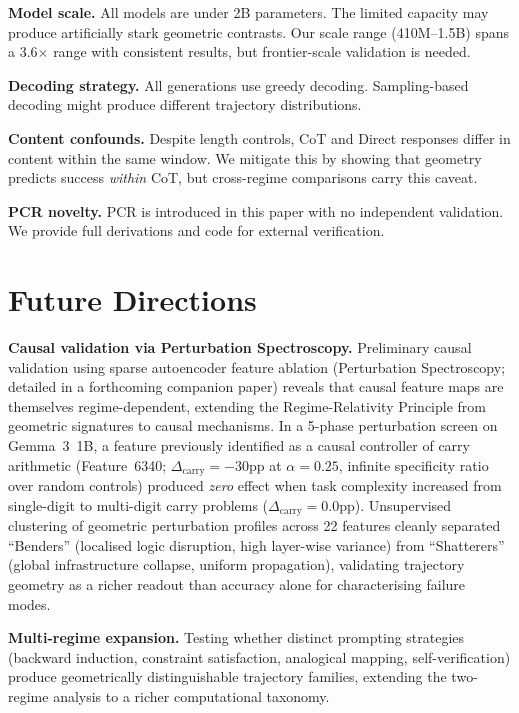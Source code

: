 \documentclass[11pt,twocolumn]{article}
\begin{document}
\textbf{Model scale.} All models are under 2B parameters. The limited capacity may produce artificially stark geometric contrasts. Our scale range (410M--1.5B) spans a 3.6$\times$ range with consistent results, but frontier-scale validation is needed.

\textbf{Decoding strategy.} All generations use greedy decoding. Sampling-based decoding might produce different trajectory distributions.

\textbf{Content confounds.} Despite length controls, CoT and Direct responses differ in content within the same window. We mitigate this by showing that geometry predicts success \emph{within} CoT, but cross-regime comparisons carry this caveat.

\textbf{PCR novelty.} PCR is introduced in this paper with no independent validation. We provide full derivations and code for external verification.


\section{Future Directions}
\label{sec:future}

\textbf{Causal validation via Perturbation Spectroscopy.} Preliminary causal validation using sparse autoencoder feature ablation (Perturbation Spectroscopy; detailed in a forthcoming companion paper) reveals that causal feature maps are themselves regime-dependent, extending the Regime-Relativity Principle from geometric signatures to causal mechanisms. In a 5-phase perturbation screen on Gemma~3~1B, a feature previously identified as a causal controller of carry arithmetic (Feature~6340; $\Delta_{\text{carry}} = -30$pp at $\alpha = 0.25$, infinite specificity ratio over random controls) produced \emph{zero} effect when task complexity increased from single-digit to multi-digit carry problems ($\Delta_{\text{carry}} = 0.0$pp). Unsupervised clustering of geometric perturbation profiles across 22 features cleanly separated ``Benders'' (localised logic disruption, high layer-wise variance) from ``Shatterers'' (global infrastructure collapse, uniform propagation), validating trajectory geometry as a richer readout than accuracy alone for characterising failure modes.

\textbf{Multi-regime expansion.} Testing whether distinct prompting strategies (backward induction, constraint satisfaction, analogical mapping, self-verification) produce geometrically distinguishable trajectory families, extending the two-regime analysis to a richer computational taxonomy.
\end{document}
